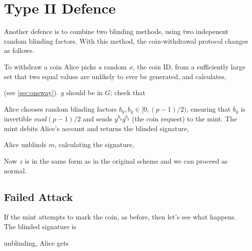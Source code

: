 \documentclass[a4paper,titlepage]{article}
\begin{document}
\section{Type II Defence\cite{Anon1}}

Another defence is to combine two blinding methods, using two
indepenent random blinding factors. With this method, the
coin-withdrawal protocol changes as follows.

To withdraw a coin Alice picks a random $x$, the coin ID, from a
sufficiently large set that two equal values are unlikely to ever be
generated, and calculates,


(see \ref{sec:oneway}). $y$ should be in $G$; check that


Alice chooses random blinding factors $b_y,b_g \in [0,(p-1)/2)$,
ensuring that $b_y$ is invertible $mod (p-1)/2$ and
sends $y^{b_y} g^{b_g}$ (the coin request) to the mint. The mint
debits Alice's account and returns the blinded signature,


Alice unblinds $m$, calculating the signature,


Now $z$ is in the same form as in the original scheme and we can
proceed as normal.

\subsection{Failed Attack}

If the mint attempts to mark the coin, as before, then let's see what
happens. The blinded signature is


unblinding, Alice gets

\end{document}
